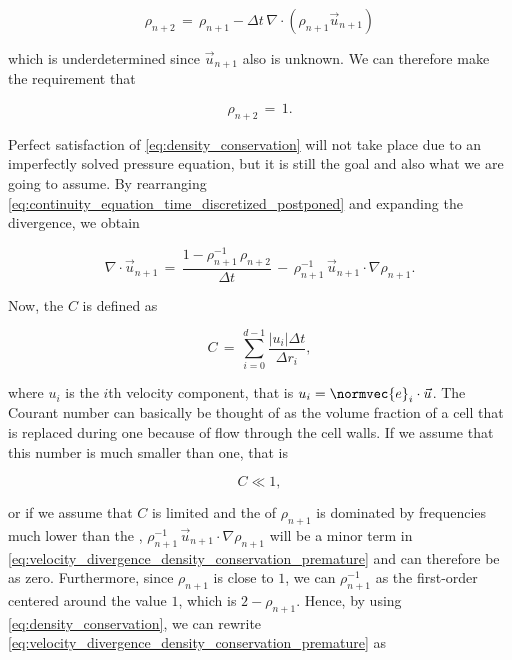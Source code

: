\begin{equation} \label{eq:continuity_equation_time_discretized_postponed}
\rho_{n+2} \,=\, \rho_{n+1} - \Delta t\,\nabla\cdot(\rho_{n+1}\vec{u}_{n+1})
\end{equation}

which is underdetermined since $\vec{u}_{n+1}$ also is unknown. We can therefore make the requirement that

\begin{equation} \label{eq:density_conservation}
\rho_{n+2} \,=\, 1.
\end{equation}

Perfect satisfaction of \eqref{eq:density_conservation} will not take place due to an imperfectly solved pressure equation, but it is still the goal and also what we are going to assume. By rearranging \eqref{eq:continuity_equation_time_discretized_postponed} and expanding the divergence, we obtain

\begin{equation} \label{eq:velocity_divergence_density_conservation_premature}
\nabla\cdot\vec{u}_{n+1} \,=\, \frac{1-\rho_{n+1}^{-1}\,\rho_{n+2}}{\Delta t} \,-\, \rho_{n+1}^{-1}\,\vec{u}_{n+1}\cdot\nabla\rho_{n+1}.
\end{equation}

Now, the  $C$ is defined as

\begin{equation}
C \,=\, \sum_{i=0}^{d-1} \frac{|u_i|\Delta t}{\Delta r_i},
\end{equation}

where $u_i$ is the $i$th velocity component, that is $u_i = \normvec{e}_i\cdot\vec{u}$. The Courant number can basically be thought of as the volume fraction of a cell that is replaced during one \timestep because of flow through the cell walls. If we assume that this number is much smaller than one, that is

\begin{equation}
C \ll 1,
\end{equation}

or if we assume that $C$ is limited and the \spectrum of $\rho_{n+1}$ is dominated by frequencies much lower than the , $\rho_{n+1}^{-1}\,\vec{u}_{n+1}\cdot\nabla\rho_{n+1}$ will be a minor term in \eqref{eq:velocity_divergence_density_conservation_premature} and can therefore be \approximated as zero. Furthermore, since $\rho_{n+1}$ is close to $1$, we can \approximate $\rho_{n+1}^{-1}$ as the first-order  centered around the value $1$, which is $2-\rho_{n+1}$. Hence, by using \eqref{eq:density_conservation}, we can rewrite \eqref{eq:velocity_divergence_density_conservation_premature} as


